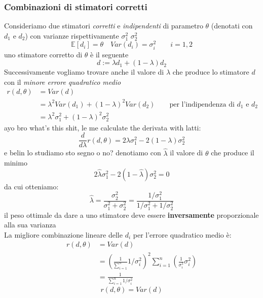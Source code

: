 \documentclass[]{article}
\newcommand{\ev}{\mathbb{E}[X]}
\renewcommand{\ev}[1]{\mathbb{E}[#1]}
\begin{document}
    \subsubsection{Combinazioni di stimatori corretti}
    Consideriamo due stimatori \textit{corretti} e \textit{indipendenti} di parametro $\theta$ (denotati con $d_1$ e $d_2$) con varianze rispettivamente $\sigma^2_1$ $\sigma^2_2$
    \[ \ev{d_i} = \theta \quad Var(d_i) = \sigma^2_i \qquad i=1,2  \]
    uno stimatore corretto di $\theta$ è il seguente
    \[ d := \lambda d_1 + (1- \lambda) d_2 \]
    Successivamente vogliamo trovare anche il valore di $\lambda$ che produce lo stimatore $d$ con il \textit{minore errore quadratico medio}
    \begin{equation*}
        \begin{split}
            r(d, \theta) &= Var(d) \\
            &= \lambda^2 Var(d_1) + (1- \lambda)^2 Var(d_2) \qquad \text{per l'indipendenza di $d_1$ e $d_2$} \\
            &= \lambda^2 \sigma^2_1 + (1-\lambda)^2 \sigma^2_2
        \end{split}
    \end{equation*}
    ayo bro what's this shit, le me calculate the derivata with latti:
    \[ \frac{d}{d \lambda} r(d, \theta) = 2 \lambda \sigma^2_1 - 2(1- \lambda) \sigma^2_2 \]
    e belin lo studiamo sto segno o no? denotiamo con $\hat{\lambda}$ il valore di $\theta$ che produce il minimo
    \[ 2 \hat{\lambda} \sigma^2_1 - 2(1- \hat{\lambda}) \sigma^2_2 = 0 \]
    da cui otteniamo:
    \[ \hat{\lambda} = \frac{\sigma^2_2}{\sigma^2_1 + \sigma^2_2} = \frac{1 / \sigma^2_1}{1 / \sigma^2_1 + 1 / \sigma^2_2} \]
    il peso ottimale da dare a uno stimatore deve essere \textbf{inversamente} proporzionale alla sua varianza \\
    La migliore combinazione lineare delle $d_i$ per l'errore quadratico medio è:
    \begin{equation*}
        \begin{split}
            r(d, \theta) &= Var(d) \\
            &= \left( \frac{1}{\sum_{i=1}^{n}} 1 / \sigma^2_i \right)^2 \sum_{i=1}^{n} \left( \frac{1}{\sigma^2_i} \sigma^2_i \right) \\
            &= \frac{1}{\sum_{i=1}^{n} 1 / \sigma^2_i}
        \end{split}
    \end{equation*}
    \[ r(d, \theta) = Var(d) \]
\end{document}
